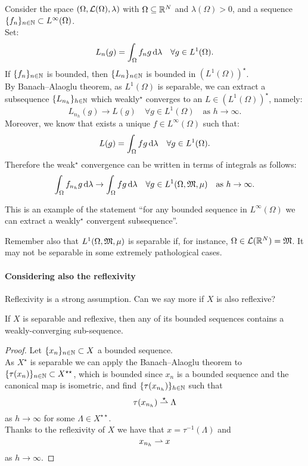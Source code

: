 \begin{exam}
	Consider the space $(\Omega, \mathcal L(\Omega), \lambda)$ with $\Omega \subseteq \mathbb R^N$ and $\lambda(\Omega) >0$, and a sequence $\{f_n\}_{n\in\mathbb N}\subset L^\infty (\Omega)$. \\
	Set: $$L_n(g) = \int_\Omega f_n g \, \mathrm d \lambda \quad \forall g \in L^1(\Omega).$$
	If $\{f_n\}_{n\in\mathbb N}$ is bounded, then $\{L_n\}_{n \in \mathbb N}$ is bounded in $(L^1(\Omega))^\star$.\\
	By Banach--Alaoglu theorem, as $L^1(\Omega)$ is separable, we can extract a subsequence $\{L_{n_h}\}_{h \in \mathbb N}$ which weakly$^\star$ converges to an $L \in (L^1(\Omega))^\star$, namely: $$L_{n_h} (g) \to L(g) \quad \forall g \in L^1(\Omega) \quad \text{as }h \to \infty.$$
	Moreover, we know that exists a unique $f \in L^\infty (\Omega)$ such that:
	$$L(g) = \int_\Omega f g \, \mathrm d \lambda \quad \forall g \in L^1(\Omega).$$
	Therefore the weak$^\star$ convergence can be written in terms of integrals as follows:
	$$\int_\Omega f_{n_h} g \,\mathrm d \lambda \to \int_\Omega f g \,\mathrm d \lambda \quad \forall g \in L^1(\Omega, \mathfrak M, \mu) \quad \text{as }h \to \infty.$$
\end{exam}

This is an example of the statement ``for any bounded sequence in $L^\infty(\Omega)$ we can extract a weakly$^\star$ convergent subsequence''.

Remember also that $L^1(\Omega,\mathfrak M,\mu)$ is separable if, for instance, $\Omega \in \mathcal L(\mathbb R^N) = \mathfrak M$.
It may not be separable in some extremely pathological cases.



\paragraph{Considering also the reflexivity} Reflexivity is a strong assumption. Can we say more if $X$ is also reflexive?
\begin{prop}
	If $X$ is separable and reflexive, then any of its bounded sequences contains a weakly-converging sub-sequence.
	\label{prop-coro-BA}
\end{prop}
\begin{proof}
	Let $\{x_n\}_{n\in\mathbb N}\subset X$ a bounded sequence.\\
	As $X^\star$ is separable we can apply the Banach--Alaoglu theorem to $\{\tau(x_n)\}_{n \in \mathbb N}\subset X^{\star\star}$, which is bounded since $x_n$ is a bounded sequence and the canonical map is isometric, and find $\{\tau(x_{n_h})\}_{h \in \mathbb N}$ such that $$\tau(x_{n_h}) \overset{\star}{\rightharpoonup} \Lambda$$ as $h \to \infty$ for some $\Lambda \in X^{\star\star}$.\\
	Thanks to the reflexivity of $X$ we have that $x = \tau^{-1}(\Lambda)$ and $$x_{n_h} \rightharpoonup x$$ as $h\to\infty$.
\end{proof}

